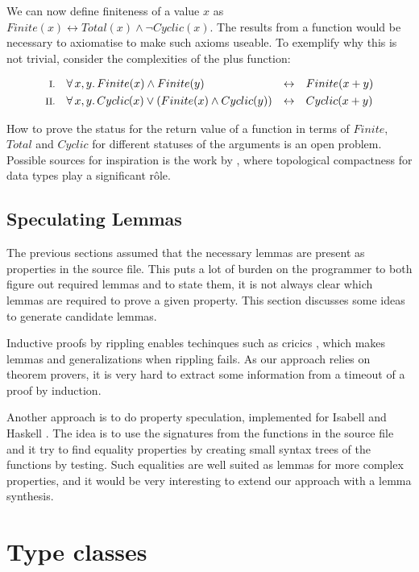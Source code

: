 \pagebreak

We can now define finiteness of a value $x$ as
$Finite(x) \leftrightarrow Total(x) \wedge \neg Cyclic(x)$.  The results
from a function would be necessary to axiomatise to make such axioms
useable. To exemplify why this is not trivial, consider the
complexities of the plus function:

\begin{align*}
\rom{1} && \faa{x}{y} & Finite(x) \wedge Finite(y)                  & \leftrightarrow &&& Finite(x + y) \\
\rom{2} && \faa{x}{y} & Cyclic(x) \vee (Finite(x) \wedge Cyclic(y)) & \leftrightarrow &&& Cyclic(x + y)
\end{align*}

How to prove the status for the return value of a function in terms of
$Finite$, $Total$ and $Cyclic$ for different statuses of the arguments is
an open problem. Possible sources for inspiration is the work by
\cite{exhaustiblesets}, where topological compactness for
data types play a significant r\^{o}le.

\subsection{Speculating Lemmas}

The previous sections assumed that the necessary lemmas are present as
properties in the source file. This puts a lot of burden on the
programmer to both figure out required lemmas and to state them, it is
not always clear which lemmas are required to prove a given
property. This section discusses some ideas to generate candidate
lemmas.

Inductive proofs by rippling enables techinques such as cricics
\citep{productiveuse}, which makes lemmas and generalizations when
rippling fails. As our approach relies on theorem provers, it is very
hard to extract some information from a timeout of a proof by induction.

Another approach is to do property speculation, implemented for
Isabell \cite{isacosy} and Haskell \cite{quickspec}. The idea is to
use the signatures from the functions in the source file and it try to
find equality properties by creating small syntax trees of the
functions by testing. Such equalities are well suited as lemmas for
more complex properties, and it would be very interesting to extend
our approach with a lemma synthesis.


\section{Type classes}
\label{sec:typeclasses}

